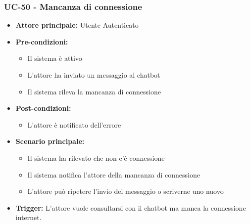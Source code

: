 \documentclass[a4paper,12pt]{article}
\begin{document}
\subsubsection{UC-50 - Mancanza di connessione} \label{sec:UC-50}
\begin{itemize}
    \item \textbf{Attore principale:} Utente Autenticato
    \item \textbf{Pre-condizioni:}
    \begin{itemize}
        \item Il sistema è attivo
        \item L'attore ha inviato un messaggio al chatbot
        \item Il sistema rileva la mancanza di connessione
    \end{itemize}
    \item \textbf{Post-condizioni:}
    \begin{itemize}
        \item L'attore è notificato dell'errore
    \end{itemize}
    \item \textbf{Scenario principale:} 
    \begin{itemize}
        \item Il sistema ha rilevato che non c'è connessione
        \item Il sistema notifica l'attore della mancanza di connessione
        \item L'attore può ripetere l'invio del messaggio o scriverne uno nuovo
       \end{itemize}
    \item \textbf{Trigger:} L'attore vuole consultarsi con il chatbot ma manca la connessione internet.
\end{itemize}
\end{document}
